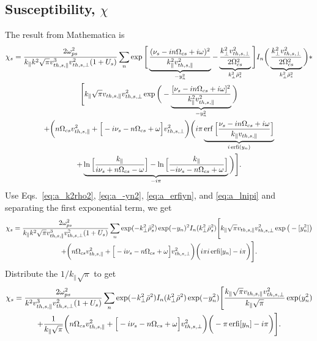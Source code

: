 \subsection{Susceptibility, $\chi$}
The result from Mathematica is
\begin{multline}
	\chi_s = \frac{2 \omega_{ps}^2}{k_\parallel k^2 \sqrt{\pi} v_{th,s,\parallel}^3 v_{th,s,\perp}^2(1+U_s)}
	\sum_n \exp \Bigg[ \underbrace{\frac{(\nu_s - in\Omega_{cs} + i\omega)^2}{k_\parallel^2 v_{th,s,\parallel}^2}}_{-y_n^2}
	- \underbrace{\frac{k_\perp^2 v_{th,s,\perp}^2}{2 \Omega_{cs}^2}}_{k_\perp^2 \bar{\rho}_s^2}  \Bigg]
	I_n \bigg( \underbrace{\frac{k_\perp^2 v_{th,s,\perp}^2}{2 \Omega_{cs}^2}}_{k_\perp^2 \bar{\rho}_s^2}  \bigg)* \\
	\Bigg[ k_\parallel \sqrt{\pi} v_{th,s,\parallel} v_{th,s,\perp}^2 
	\exp \bigg( - \underbrace{\frac{[\nu_s - i n\Omega_{cs}+ i \omega]^2}{k_\parallel^2 v_{th,s,\parallel}^2}}_{-y_n^2}   \bigg) \\
	+ \bigg( n\Omega_{cs} v_{th,s,\parallel}^2 + \Big[ -i\nu_s - n\Omega_{cs}+ \omega \Big] v_{th,s,\perp}^2  \bigg)
	\bigg( i \pi \underbrace{\operatorname{erf} \Big[ \frac{\nu_s - in\Omega_{cs}+i\omega}{k_\parallel v_{th,s,\parallel}}  \Big]}_{i \operatorname{erfi}(y_n)}\\
	+ \underbrace{\ln \Big[ \frac{k_\parallel}{i\nu_s + n\Omega_{cs} - \omega} \Big]
	- \ln \Big[ \frac{k_\parallel}{-i\nu_s - n\Omega_{cs} + \omega} \Big]}_{-i\pi}
	\bigg)
	\Bigg].
\end{multline}
Use Eqs.~\ref{eq:a_k2rho2}, \ref{eq:a_-yn2}, \ref{eq:a_erfiyn}, and \ref{eq:a_lnipi} and separating the first exponential term, we get
\begin{multline}
	\chi_s = \frac{2\omega_{ps}^2}{k_\parallel k^2 \sqrt{\pi} v_{th,s,\parallel}^3 v_{th,s,\perp}^2(1+U_s)} 
	\sum_n \exp(-k_\perp^2 \bar{\rho}_s^2) \exp(-y_n)^2 I_n(k_\perp^2 \bar{\rho}_s^2)
	\Bigg[ k_\parallel \sqrt{\pi} v_{th,s,\parallel} v_{th,s,\perp}^2 \exp\big( -[y_n^2] \big)  \\+
	\bigg( n\Omega_{cs} v_{th,s,\parallel}^2 + \Big[ -i\nu_s - n\Omega_{cs}+ \omega \Big] v_{th,s,\perp}^2 \bigg)
	\bigg( i \pi i \operatorname{erfi}[y_n] - i\pi \bigg)
	\Bigg].
\end{multline}
Distribute the $1/k_\parallel \sqrt{\pi}$ to get
\begin{multline}
	\chi_s = \frac{2\omega_{ps}^2}{k^2 v_{th,s,\parallel}^3 v_{th,s,\perp}^2 (1+U_s)} \sum_n
	\exp(-k_\perp^2 \bar{\rho}^2) I_n(k_\perp^2 \bar{\rho}^2) \exp(-y_n^2)
	\Bigg[ \frac{k_\parallel \sqrt{\pi} v_{th,s,\parallel} v_{th,s,\perp}^2}{k_\parallel \sqrt{\pi}} \exp(y_n^2) \\
	+ \frac{1}{k_\parallel \sqrt{\pi}} 
	\bigg( n\Omega_{cs} v_{th,s,\parallel}^2 + \Big[ -i\nu_s - n\Omega_{cs}+ \omega \Big] v_{th,s,\perp}^2 \bigg)
	\bigg( - \pi \operatorname{erfi}[y_n] - i\pi \bigg)
	\Bigg].
\end{multline}
